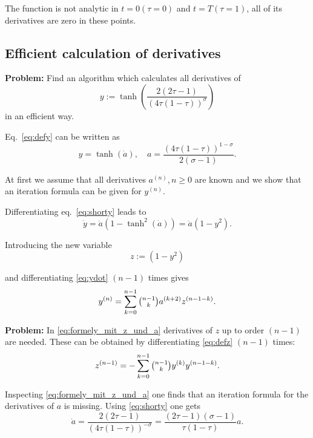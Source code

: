 \documentclass[a4paper,11pt,headings=standardclasses,parskip=half]{scrartcl}
\begin{document}
\begin{appendices}
The function is not analytic in  $t=0 (\tau = 0)$ and $t=T (\tau = 1)$, all of its derivatives are zero in these points.
\subsection{Efficient calculation of derivatives}
\textbf{Problem:} Find an algorithm which calculates all derivatives of
\begin{equation}\label{eq:defy}
  y:=\tanh\left(\frac{2(2\tau-1)}{(4\tau(1-\tau))^{\sigma}}\right)
\end{equation}
in an efficient way.

Eq.\ \eqref{eq:defy} can be written as
\begin{equation}\label{eq:shorty}
  y=\tanh(\dot{a}),\quad a=\frac{(4\tau(1-\tau))^{1-\sigma}}{2(\sigma-1)}.
\end{equation}

At first we assume that all derivatives $a^{(n)},n \ge 0$ are known and we show that an iteration formula can be given for $y^{(n)}$.

Differentiating eq.\ \eqref{eq:shorty} leads to
\begin{equation}\label{eq:ydot}
 \dot{y}=\ddot{a}(1-\tanh^2(\dot{a}))=\ddot{a}(1-y^2).
\end{equation}

Introducing the new variable
\begin{equation} \label{eq:defz}
 z:=(1-y^2)
\end{equation}

and differentiating \eqref{eq:ydot} $(n-1)$ times gives
\begin{equation} \label{eq:formely_mit_z_und_a}
y^{(n)}=\sum_{k=0}^{n-1}\tbinom
{n-1}{k}a^{(k+2)}z^{(n-1-k)}.
\end{equation}


\textbf{Problem:} In \eqref{eq:formely_mit_z_und_a} derivatives of $z$ up to order $(n-1)$ are needed. These can be
obtained by differentiating \eqref{eq:defz} $(n-1)$ times:
\begin{equation*} 
z^{(n-1)}=-\sum_{k=0}^{n-1}\tbinom
{n-1}{k}y^{(k)}y^{(n-1-k)}.
\end{equation*}


Inspecting  \eqref{eq:formely_mit_z_und_a} one finds that an iteration formula for the derivatives of $a$ is missing. Using \eqref{eq:shorty} one gets
\begin{equation*}
\dot{a}=\frac{2(2\tau-1)}{(4\tau(1-\tau))^{-\sigma}}=\frac{(2\tau-1)(\sigma-1)}{\tau(1-\tau)}a.
\end{equation*}


\end{appendices}
\end{document}
